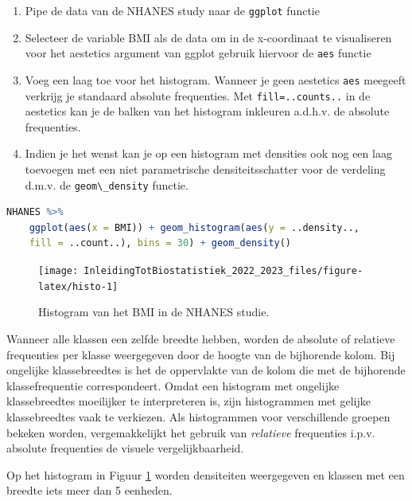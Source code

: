 \documentclass[
  12pt,dutch,coursenotes]{book}
\newcommand{\passthrough}[1]{#1}
\providecommand{\tightlist}{%
  \setlength{\itemsep}{0pt}\setlength{\parskip}{0pt}}
\begin{document}
\begin{enumerate}
\def\labelenumi{\arabic{enumi}.}
\tightlist
\item
  Pipe de data van de NHANES study naar de \passthrough{\lstinline!ggplot!} functie
\item
  Selecteer de variable BMI als de data om in de x-coordinaat te visualiseren voor het aestetics argument van ggplot gebruik hiervoor de \passthrough{\lstinline!aes!} functie
\item
  Voeg een laag toe voor het histogram. Wanneer je geen aestetics \passthrough{\lstinline!aes!} meegeeft verkrijg je standaard absolute frequenties. Met \passthrough{\lstinline!fill=..counts..!} in de aestetics kan je de balken van het histogram inkleuren a.d.h.v. de absolute frequenties.
\item
  Indien je het wenst kan je op een histogram met densities ook nog een laag toevoegen met een niet parametrische densiteitsschatter voor de verdeling d.m.v. de \passthrough{\lstinline!geom\_density!} functie.
\end{enumerate}

\begin{lstlisting}[language=R]
NHANES %>%
    ggplot(aes(x = BMI)) + geom_histogram(aes(y = ..density..,
    fill = ..count..), bins = 30) + geom_density()
\end{lstlisting}

\begin{figure}

{\centering \texttt{[image: InleidingTotBiostatistiek\_2022\_2023\_files/figure-latex/histo-1]} 

}

\caption{Histogram van het BMI in de NHANES studie.}\label{fig:histo}
\end{figure}

Wanneer alle klassen
een zelfde breedte hebben, worden de absolute of relatieve frequenties per
klasse weergegeven door de hoogte van de bijhorende kolom. Bij ongelijke
klassebreedtes is het de oppervlakte van de kolom die met de bijhorende
klassefrequentie correspondeert. Omdat een histogram met ongelijke
klassebreedtes moeilijker te interpreteren is, zijn histogrammen met gelijke
klassebreedtes vaak te verkiezen. Als histogrammen voor verschillende
groepen bekeken worden, vergemakkelijkt het gebruik van \emph{relatieve}
frequenties i.p.v. absolute frequenties de visuele vergelijkbaarheid.

Op het histogram in Figuur \ref{fig:histo} worden densiteiten
weergegeven en klassen met een breedte iets meer dan 5 eenheden.
\end{document}
